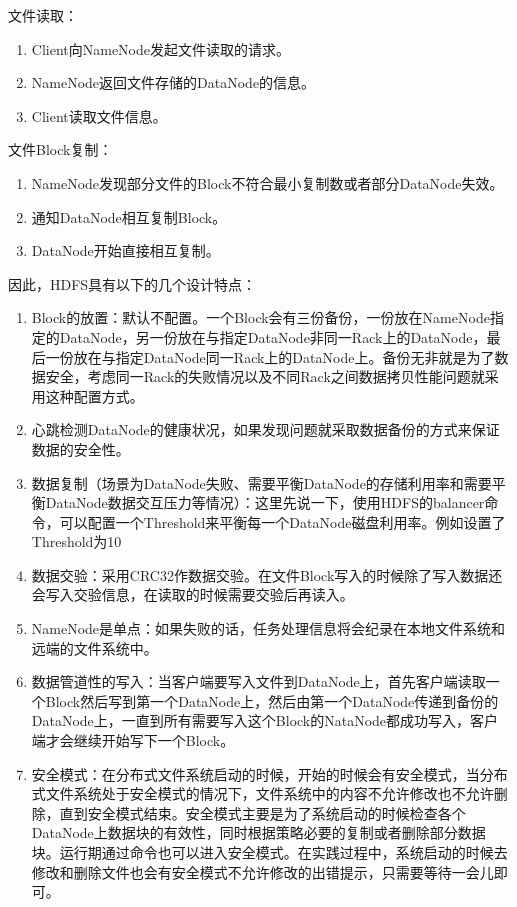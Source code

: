 文件读取：

\begin{enumerate}
\item Client向NameNode发起文件读取的请求。
\item NameNode返回文件存储的DataNode的信息。
\item Client读取文件信息。
\end{enumerate}

文件Block复制：

\begin{enumerate}
\item NameNode发现部分文件的Block不符合最小复制数或者部分DataNode失效。
\item 通知DataNode相互复制Block。
\item DataNode开始直接相互复制。
\end{enumerate}

因此，HDFS具有以下的几个设计特点：

\begin{enumerate}
\item Block的放置：默认不配置。一个Block会有三份备份，一份放在NameNode指定的DataNode，另一份放在与指定DataNode非同一Rack上的DataNode，最后一份放在与指定DataNode同一Rack上的DataNode上。备份无非就是为了数据安全，考虑同一Rack的失败情况以及不同Rack之间数据拷贝性能问题就采用这种配置方式。
\item 心跳检测DataNode的健康状况，如果发现问题就采取数据备份的方式来保证数据的安全性。
\item 数据复制（场景为DataNode失败、需要平衡DataNode的存储利用率和需要平衡DataNode数据交互压力等情况）：这里先说一下，使用HDFS的balancer命令，可以配置一个Threshold来平衡每一个DataNode磁盘利用率。例如设置了Threshold为10%
\item 数据交验：采用CRC32作数据交验。在文件Block写入的时候除了写入数据还会写入交验信息，在读取的时候需要交验后再读入。
\item NameNode是单点：如果失败的话，任务处理信息将会纪录在本地文件系统和远端的文件系统中。
\item 数据管道性的写入：当客户端要写入文件到DataNode上，首先客户端读取一个Block然后写到第一个DataNode上，然后由第一个DataNode传递到备份的DataNode上，一直到所有需要写入这个Block的NataNode都成功写入，客户端才会继续开始写下一个Block。
\item 安全模式：在分布式文件系统启动的时候，开始的时候会有安全模式，当分布式文件系统处于安全模式的情况下，文件系统中的内容不允许修改也不允许删除，直到安全模式结束。安全模式主要是为了系统启动的时候检查各个DataNode上数据块的有效性，同时根据策略必要的复制或者删除部分数据块。运行期通过命令也可以进入安全模式。在实践过程中，系统启动的时候去修改和删除文件也会有安全模式不允许修改的出错提示，只需要等待一会儿即可。
\end{enumerate}

